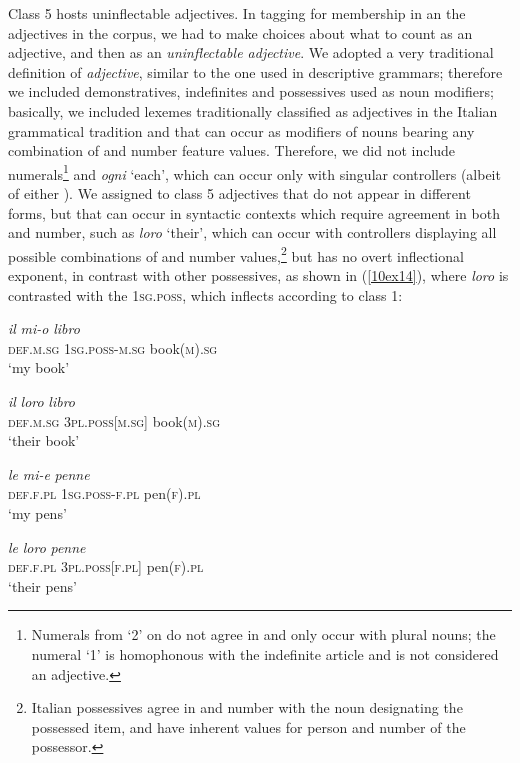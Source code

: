 \documentclass[output=paper,colorlinks,citecolor=brown]{langscibook}
\begin{document}
Class 5 hosts uninflectable adjectives. In tagging for membership in an  the adjectives in the corpus, we had to make choices about what to count as an adjective, and then as an \textit{uninflectable adjective}. We adopted a very traditional definition of \textit{adjective}, similar to the one used in descriptive grammars; therefore we included demonstratives, indefinites and possessives used as noun modifiers; basically, we included lexemes traditionally classified as adjectives in the Italian grammatical tradition and that can occur as modifiers of nouns bearing any combination of  and number feature values. Therefore, we did not include numerals\footnote{Numerals from `2' on do not agree in  and only occur with plural nouns; the numeral `1' is homophonous with the indefinite article and is not considered an adjective.} and \emph{ogni} `each', which can occur only with singular controllers (albeit of either ). We assigned to class 5 adjectives that do not appear in different forms, but that can occur in syntactic contexts which require agreement in both  and number, such as \emph{loro} `their', which can occur with controllers displaying all possible combinations of  and number values,\footnote{Italian possessives agree in  and number with the noun designating the possessed item, and have inherent values for person and number of the possessor.} but has no overt inflectional exponent, in contrast with other possessives, as shown in (\ref{10ex14}), where \emph{loro} is contrasted with the \textsc{1sg.poss}, which inflects according to class 1:

\begin{exe}
	\ex \label{10ex14}
	\begin{xlist}
		\ex 
		\gll \emph{il} \emph{mi-o} \emph{libro} \\
		\textsc{def.m.sg} \textsc{1sg.poss}-\textsc{m.sg} book(\textsc{m}).\textsc{sg} \\
		\trans ‘my book’
		
		\ex 
		\gll \emph{il} \emph{loro} \emph{libro} \\
		\textsc{def.m.sg} \textsc{3pl.poss}[\textsc{m.sg}] book(\textsc{m}).\textsc{sg} \\
		\trans ‘their book’
		
		\ex 
		\gll \emph{le} \emph{mi-e} \emph{penne} \\
		\textsc{def.f.pl} \textsc{1sg.poss}-\textsc{f.pl} pen(\textsc{f}).\textsc{pl} \\
		\trans ‘my pens’
		
		\ex 
		\gll \emph{le} \emph{loro} \emph{penne} \\
		\textsc{def.f.pl} \textsc{3pl.poss}[\textsc{f.pl}] pen(\textsc{f}).\textsc{pl} \\
		\trans ‘their pens’
	\end{xlist}
\end{exe}
\end{document}
